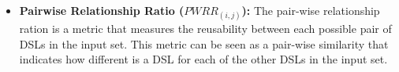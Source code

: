 \begin{itemize}

\vspace{2mm}
\item \textbf{Pairwise Relationship Ratio ($PWRR_{(i,j)}$):} The pair-wise relationship ration is a metric that measures the reusability between each possible pair of DSLs in the input set. This metric can be seen as a pair-wise similarity that indicates how different is a DSL for each of the other DSLs in the input set.

\end{itemize}
